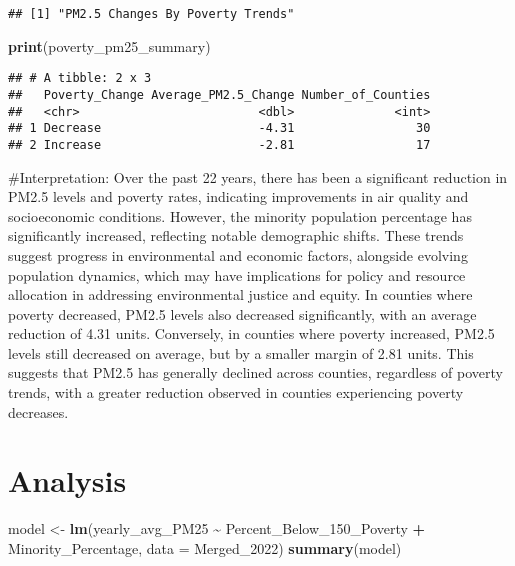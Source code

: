 \documentclass[
]{article}
\newenvironment{Shaded}{\begin{snugshade}}{\end{snugshade}}
\newcommand{\AttributeTok}[1]{\textcolor[rgb]{0.13,0.29,0.53}{#1}}
\newcommand{\FunctionTok}[1]{\textcolor[rgb]{0.13,0.29,0.53}{\textbf{#1}}}
\newcommand{\NormalTok}[1]{#1}
\newcommand{\OtherTok}[1]{\textcolor[rgb]{0.56,0.35,0.01}{#1}}
\newcommand{\SpecialCharTok}[1]{\textcolor[rgb]{0.81,0.36,0.00}{\textbf{#1}}}
\begin{document}
\begin{verbatim}
## [1] "PM2.5 Changes By Poverty Trends"
\end{verbatim}

\begin{Shaded}
\begin{Highlighting}[]
\FunctionTok{print}\NormalTok{(poverty\_pm25\_summary)}
\end{Highlighting}
\end{Shaded}

\begin{verbatim}
## # A tibble: 2 x 3
##   Poverty_Change Average_PM2.5_Change Number_of_Counties
##   <chr>                         <dbl>              <int>
## 1 Decrease                      -4.31                 30
## 2 Increase                      -2.81                 17
\end{verbatim}

\#Interpretation: Over the past 22 years, there has been a significant
reduction in PM2.5 levels and poverty rates, indicating improvements in
air quality and socioeconomic conditions. However, the minority
population percentage has significantly increased, reflecting notable
demographic shifts. These trends suggest progress in environmental and
economic factors, alongside evolving population dynamics, which may have
implications for policy and resource allocation in addressing
environmental justice and equity. In counties where poverty decreased,
PM2.5 levels also decreased significantly, with an average reduction of
4.31 units. Conversely, in counties where poverty increased, PM2.5
levels still decreased on average, but by a smaller margin of 2.81
units. This suggests that PM2.5 has generally declined across counties,
regardless of poverty trends, with a greater reduction observed in
counties experiencing poverty decreases.

\newpage

\section{Analysis}\label{analysis}

\begin{Shaded}
\begin{Highlighting}[]
\NormalTok{model }\OtherTok{\textless{}{-}} \FunctionTok{lm}\NormalTok{(yearly\_avg\_PM25 }\SpecialCharTok{\textasciitilde{}}\NormalTok{ Percent\_Below\_150\_Poverty }\SpecialCharTok{+}\NormalTok{ Minority\_Percentage, }\AttributeTok{data =}\NormalTok{ Merged\_2022)}
\FunctionTok{summary}\NormalTok{(model)}
\end{Highlighting}
\end{Shaded}
\end{document}
